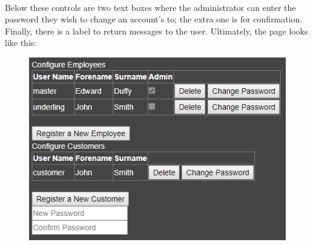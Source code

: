 ﻿\documentclass{article}
\begin{document}
    \paragraph{}
    Below these controls are two text boxes where the administrator can enter the password they wish to change an account's to; the extra one is for confirmation.
    Finally, there is a label to return messages to the user.
    Ultimately, the page looks like this:
    \begin{figure}[h]
        \includegraphics{userConfigPage.png}
        \centering
    \end{figure}
\end{document}
